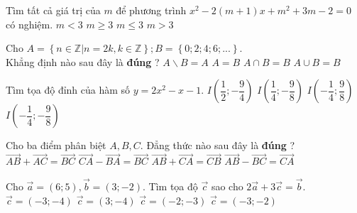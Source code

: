 \begin{ex}%
	Tìm tất cả giá trị của $m$ để phương trình $x^2-2(m+1)x+m^2+3m-2=0$ có nghiệm.
	\choice
	{ $m<3$}
	{$m\geq 3$}
	{\True $m \leq 3$}
	{$m>3$}
\end{ex}


\begin{ex}%
	Cho  $A=\left\{n\in \mathbb{Z}|n=2k,k\in \mathbb{Z}\right\}; B=\left\{0;2;4;6;...\right\}. $\\ Khẳng định nào sau đây là \textbf{đúng} ?
	\choice
	{ $A\backslash B=A$}
	{$ A=B$}
	{\True $ A\cap B=B$}
	{$ A\cup B=B$}
\end{ex}


\begin{ex}%
	Tìm tọa độ đỉnh của hàm số $y=2x^2-x-1$.
	\choice
	{ $I\left(\dfrac{1}{2};-\dfrac{9}{4}\right)$}
	{\True $ I\left(\dfrac{1}{4};-\dfrac{9}{8}\right)$}
	{$ I\left(-\dfrac{1}{4};\dfrac{9}{8}\right)$}
	{$ I\left(-\dfrac{1}{4};-\dfrac{9}{8}\right)$}
\end{ex}


\begin{ex}%
	Cho ba điểm phân biệt $A,B,C$. Đẳng thức nào sau đây là \textbf{đúng} ?
	\choice
	{ $\vec{AB}+\vec{AC}=\vec{BC}$}
	{$\vec{CA}-\vec{BA}=\vec{BC} $}
	{\True $ \vec{AB}+\vec{CA}=\vec{CB}$}
	{$ \vec{AB}-\vec{BC}=\vec{CA}$}
\end{ex}

\begin{ex}%
	Cho $\vec{a}=\left(6;5\right),\vec{b}=\left(3;-2\right).$ Tìm tọa độ $\vec{c}$ sao cho $2\vec{a}+3\vec{c}=\vec{b}$.
	\choice
	{\True $\vec{c}=\left(-3;-4\right)$}
	{$ \vec{c}=\left(3;-4\right)$}
	{$ \vec{c}=\left(-2;-3\right)$}
	{$ \vec{c}=\left(-3;-2\right)$}
\end{ex}

